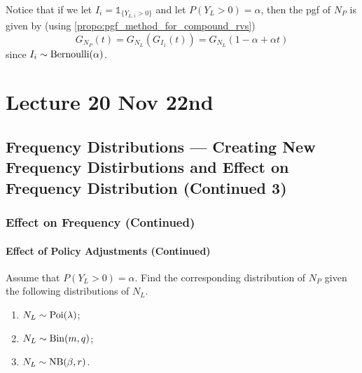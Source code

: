 \documentclass[notoc,notitlepage]{tufte-book}
\begin{document}
Notice that if we let $I_i = \mathbb{1}_{\{ Y_{L, i} > 0 \}}$ and let $P(Y_L > 0) = \alpha$, then the pgf of $N_P$ is given by (using \cref{propo:pgf_method_for_compound_rvs})
\begin{equation*}
  G_{N_P}(t) = G_{N_L}( G_{I_1}(t) ) = G_{N_L}(1 - \alpha + \alpha t)
\end{equation*}
since $I_i \sim \operatorname{Bernoulli}(\alpha)$.





\chapter{Lecture 20 Nov 22nd}%
\label{chp:lecture_20_nov_22nd}

\section{Frequency Distributions --- Creating New Frequency Distirbutions and Effect on Frequency Distribution (Continued 3)}%
\label{sec:frequency_distributions_creating_new_frequency_distirbutions_and_effect_on_frequency_distribution_continued_3}

\subsection{Effect on Frequency (Continued)}%
\label{sub:effect_on_frequency_continued}

\subsubsection{Effect of Policy Adjustments (Continued)}%
\label{ssub:effect_of_policy_adjustments_continued}

\begin{eg}
  Assume that $P(Y_L > 0) = \alpha$. Find the corresponding distribution of $N_P$ given the following distributions of $N_L$.
  \begin{enumerate}
    \item $N_L \sim \operatorname{Poi}(\lambda)$;
    \item $N_L \sim \operatorname{Bin}(m, q)$;
    \item $N_L \sim \operatorname{NB}(\beta, r)$.
  \end{enumerate}
\end{eg}
\end{document}
